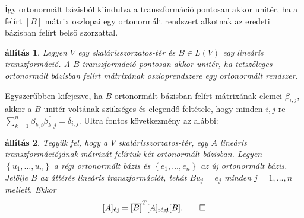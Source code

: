 \documentclass[a4paper, showtrims]{memoir}
\theoremstyle{plain}
\newtheorem{proposition}{állítás}[chapter]
\theoremstyle{remark}
\theoremstyle{definition}
\newcommand{\uj}{\text{új}}
\newcommand{\rgi}{\text{régi}}
\begin{document}
Így ortonormált bázisból kiindulva a transzformáció pontosan akkor unitér, ha
a felírt $[B]$ mátrix oszlopai egy ortonormált rendszert alkotnak az eredeti bázisban felírt belső szorzattal.
\begin{proposition}
	Legyen $V$ egy skalárisszorzatos-tér és $B\in L\left( V \right)$ egy lineáris transzformáció.
	A $B$ transzformáció pontosan akkor unitér,
	ha tetszőleges ortonormált bázisban felírt mátrixának oszloprendszere egy ortonormált rendszer.
\end{proposition}
Egyszerűbben kifejezve, ha $B$ ortonormált bázisban felírt mátrixának elemei $\beta_{i,j}$,
akkor a $B$ unitér voltának szükséges és elegendő feltétele,
hogy minden $i,j$-re
$\sum_{k=1}^n\beta_{k,i}\overline{\beta_{k,j}}=\delta_{i,j}$.
Ultra fontos következmény az alábbi:
\begin{proposition}
	Tegyük fel, hogy a $V$ skalárisszorzatos-tér, egy $A$ lineáris transzformációjának mátrixát felírtuk
	két ortonormált bázisban.
	Legyen $\left\{ u_1,\ldots,u_n \right\}$ a régi ortonormált bázis és $\left\{ e_1,\ldots,e_n \right\}$ az új ortonormált bázis.
	Jelölje $B$ az áttérés lineáris transzformációt, tehát $Bu_j=e_j$ minden $j=1,\ldots,n$ mellett.
	Ekkor
	\[
		[A]_\uj=\overline{[B]}^T[A]_{\rgi}[B].
		\qedhere
	\]
\end{proposition}
\end{document}
